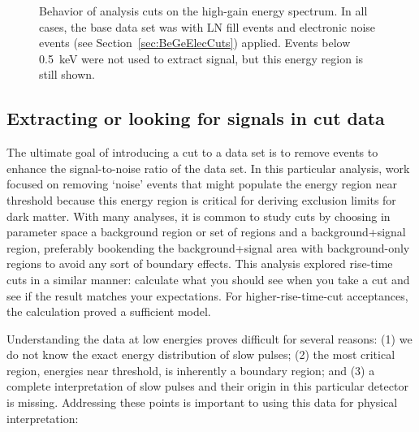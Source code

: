 				\begin{figure}
					\centering
					\def\figwidth{0.7\textwidth}
					\caption[Behavior of analysis cuts on the high-gain energy spectrum.]
					{Behavior of analysis cuts on the high-gain energy spectrum.  In all cases, the base data set was with LN fill events and electronic noise events (see 
					Section~\ref{sec:BeGeElecCuts}) applied.  Events below 0.5~keV were not used to extract signal, but this energy region is still shown.}
					\label{fig:BehaviorOfCuts}
				\end{figure}			
		

	\subsection{Extracting or looking for signals in cut data}
	\label{sec:BeGeLowEnergyFeatures}
	
	The ultimate goal of introducing a cut to a data set is to remove events to enhance the signal-to-noise ratio of the data set.  In this particular analysis, work focused on removing `noise' events that might populate the energy region near threshold because this energy region is critical for deriving exclusion limits for dark matter.  With many analyses, it is common to study cuts by choosing in parameter space a background region or set of regions and a background+signal region, preferably bookending the background+signal area with background-only regions to avoid any sort of boundary effects.   This analysis explored rise-time cuts in a similar manner: calculate what you should see when you take a cut and see if the result matches your expectations.  For higher-rise-time-cut acceptances, the calculation proved a sufficient model.  
	
	
	Understanding the data at low energies proves difficult for several reasons: (1) we do not know the exact energy distribution of slow pulses; (2) the most critical region, energies near threshold, is inherently a boundary region; and (3) a complete interpretation of slow pulses and their origin in this particular detector is missing.  Addressing these points is important to using this data for physical interpretation:
	
